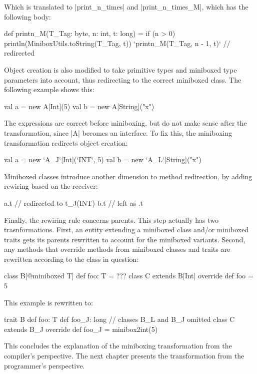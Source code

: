 Which is translated to |print_n_times| and |print_n_times_M|, which has the following body:

\begin{lstlisting-nobreak}
 def printn_M(T_Tag: byte, n: int, t: long) =
   if (n > 0) {
     println(MiniboxUtils.toString(T_Tag, t))
     `printn_M(T_Tag, n - 1, t)` // redirected
   }
\end{lstlisting-nobreak}

Object creation is also modified to take primitive types and miniboxed type parameters into account, thus redirecting to the correct miniboxed class. The following example shows this:

\begin{lstlisting-nobreak}
 val a = new A[Int](5)
 val b = new A[String]("x")
\end{lstlisting-nobreak}

The expressions are correct before miniboxing, but do not make sense after the transformation, since |A| becomes an interface. To fix this, the miniboxing transformation redirects object creation:

\begin{lstlisting-nobreak}
 val a = new `A_J`[Int](`INT`, 5)
 val b = new `A_L`[String]("x")
\end{lstlisting-nobreak}

Miniboxed classes introduce another dimension to method redirection, by adding rewiring based on the receiver:

\begin{lstlisting-nobreak}
  a.t // redirected to t_J(INT)
  b.t // left as .t
\end{lstlisting-nobreak}

Finally, the rewiring rule concerns parents. This step actually has two trasnformations. First, an entity extending a miniboxed class and/or miniboxed traits gets its parents rewritten to account for the miniboxed variants. Second, any methods that override methods from miniboxed classes and traits are rewritten according to the class in question:

\begin{lstlisting-nobreak}
  class B[@miniboxed T]   { def foo: T = ??? }
  class C extends B[Int] { override def foo = 5 }
\end{lstlisting-nobreak}

This example is rewritten to:

\begin{lstlisting-nobreak}
  trait B {
    def foo: T
    def foo_J: long
  }
  // classes B_L and B_J omitted
  class C extends B_J {
    override def foo_J = minibox2int(5)
  }
\end{lstlisting-nobreak}

This concludes the explanation of the miniboxing transformation from the compiler's perspective. The next chapter presents the transformation from the programmer's perspective.
